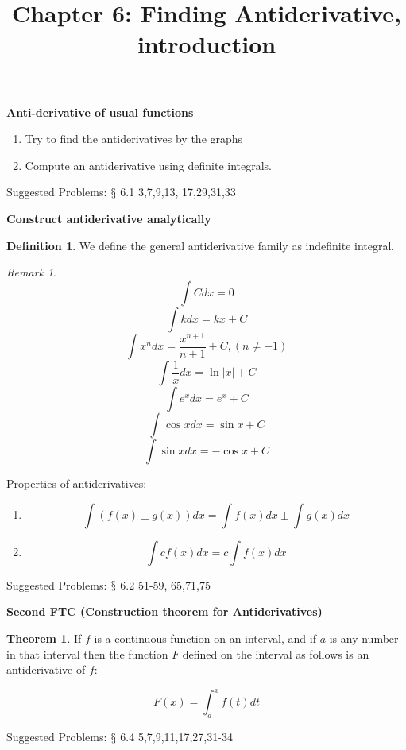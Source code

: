 \documentclass[12pt]{article}
\date{}
\title{Chapter 6: Finding Antiderivative, introduction}
\theoremstyle{definition}
\newtheorem{thm}{Theorem}[section]
\theoremstyle{definition}
\newtheorem{definition}{Definition}[section]
\theoremstyle{remark}
\newtheorem*{remark}{Remark}
\theoremstyle{definition}
\theoremstyle{definition}
\theoremstyle{definition}
\begin{document}
\maketitle





\textbf{Anti-derivative of usual functions}

\begin{enumerate}
	\item Try to find the antiderivatives by the graphs
	\item Compute an antiderivative using definite integrals.
\end{enumerate}

Suggested Problems: $\mathsection$ 6.1 3,7,9,13, 17,29,31,33

\hrulefill

\textbf{Construct antiderivative analytically}

\begin{definition}
	We define the general antiderivative family as indefinite integral.
\end{definition}

\begin{remark}
	\[\int C dx = 0\]
	\[\int kdx=kx+C\]
	\[\int x^ndx=\frac{x^{n+1}}{n+1}+C, (n \neq -1)\]
	\[\int \frac{1}{x}dx = \ln|x|+C\]
	\[\int e^xdx=e^x+C \]
	\[\int \cos xdx=\sin x + C \]
	\[\int \sin xdx=-\cos x + C \]	
	
\end{remark}


\hrulefill


Properties of antiderivatives:

\begin{enumerate}
\item \[\int (f(x) \pm g(x))dx=\int f(x) dx \pm \int g(x) dx\]
\item \[\int cf(x) dx = c \int f(x) dx\]
\end{enumerate}


Suggested Problems: $\mathsection$  6.2 51-59, 65,71,75


\hrulefill

\textbf{Second FTC (Construction theorem for Antiderivatives)}

\begin{thm}
If $f$ is a continuous function on an interval, and if $a$ is any number in that interval then the function $F$ defined on the interval as follows is an antiderivative of $f$:

\[F(x)=\int^x_a f(t) dt\]
\end{thm}

Suggested Problems: $\mathsection$ 6.4  5,7,9,11,17,27,31-34
\end{document}
